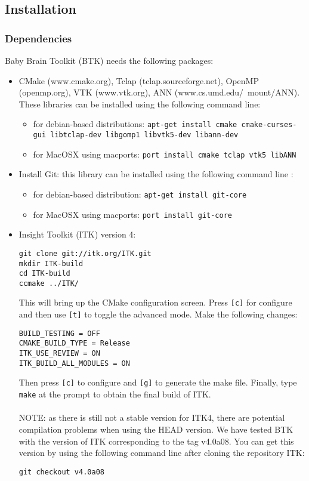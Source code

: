 \documentclass[a4paper,10pt]{article}
\begin{document}
\subsection{Installation}

\subsubsection{Dependencies}

Baby Brain Toolkit (BTK) needs the following packages:
\begin{itemize}
 \item CMake (www.cmake.org), Tclap (tclap.sourceforge.net), OpenMP (openmp.org), VTK (www.vtk.org), ANN (www.cs.umd.edu/\string~mount/ANN). These libraries can be installed using the following command line: 
 \begin{itemize}
 \item for debian-based distributions: \texttt{apt-get install cmake cmake-curses-gui libtclap-dev libgomp1 libvtk5-dev libann-dev}
 \item for MacOSX using macports: \texttt{port install cmake tclap vtk5 libANN}
 \end{itemize}
 \item Install Git: this library can be installed using the following command line : 
 \begin{itemize}
 \item for debian-based distribution: \texttt{apt-get install git-core}
 \item for MacOSX using macports: \texttt{port install git-core}
 \end{itemize}
 \item Insight Toolkit (ITK) version 4:
\begin{verbatim}
git clone git://itk.org/ITK.git
mkdir ITK-build
cd ITK-build
ccmake ../ITK/
\end{verbatim}
This will bring up the CMake configuration screen. Press \texttt{[c]} for configure and then use \texttt{[t]} to toggle the advanced mode. Make the following changes:
\begin{verbatim}
BUILD_TESTING = OFF
CMAKE_BUILD_TYPE = Release
ITK_USE_REVIEW = ON
ITK_BUILD_ALL_MODULES = ON
\end{verbatim}
Then press \texttt{[c]} to configure and \texttt{[g]} to generate the make file.
Finally, type \texttt{make} at the prompt to obtain the final build of ITK.\\\\
NOTE: as there is still not a stable version for ITK4, there are potential
compilation problems when using the HEAD version. We have tested BTK with the
version of ITK corresponding to the tag v4.0a08. You can get this version by
using the following command line after cloning the repository ITK:
\begin{verbatim}
git checkout v4.0a08
\end{verbatim}


\end{itemize}
\end{document}
